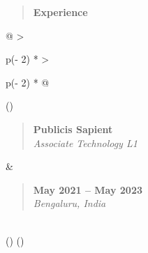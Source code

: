 \documentclass[
]{article}
\begin{document}
\begin{quote}
\textbf{Experience}
\end{quote}

\begin{longtable}[]{@{}
  >{\raggedright\arraybackslash}p{(\columnwidth - 2\tabcolsep) * }
  >{\raggedright\arraybackslash}p{(\columnwidth - 2\tabcolsep) * }@{}}
\toprule()
\begin{minipage}[b]{\linewidth}\raggedright
\begin{quote}
\textbf{Publicis Sapient}\\
\emph{Associate Technology L1}
\end{quote}\strut
\end{minipage} & \begin{minipage}[b]{\linewidth}\raggedright
\begin{quote}
\textbf{May 2021 -- May 2023}\\
\emph{Bengaluru, India}
\end{quote}\strut
\end{minipage} \\
\midrule()
\endhead
\bottomrule()
\end{longtable}
\end{document}
